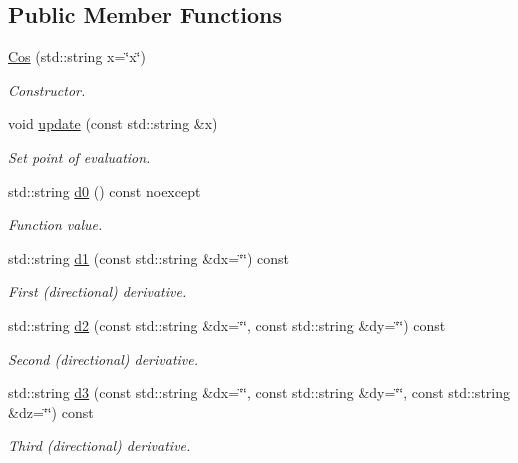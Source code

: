 \subsection*{Public Member Functions}
\begin{DoxyCompactItemize}
\item 
\hyperlink{structFunG_1_1texify_1_1Cos_afa8ef16bb63bf84ed292cf570a51fe43}{Cos} (std\-::string x=\char`\"{}x\char`\"{})
\begin{DoxyCompactList}\small\item\em Constructor. \end{DoxyCompactList}\item 
void \hyperlink{structFunG_1_1texify_1_1Cos_a72a69fddcac8cfd95da506b8f601c383}{update} (const std\-::string \&x)
\begin{DoxyCompactList}\small\item\em Set point of evaluation. \end{DoxyCompactList}\item 
std\-::string \hyperlink{structFunG_1_1texify_1_1Cos_a52e954aa7573562dfc424cd5b843080c}{d0} () const noexcept
\begin{DoxyCompactList}\small\item\em Function value. \end{DoxyCompactList}\item 
std\-::string \hyperlink{structFunG_1_1texify_1_1Cos_ae286506ec155649738ed8d43cb99844d}{d1} (const std\-::string \&dx=\char`\"{}\char`\"{}) const 
\begin{DoxyCompactList}\small\item\em First (directional) derivative. \end{DoxyCompactList}\item 
std\-::string \hyperlink{structFunG_1_1texify_1_1Cos_a27b2fd25de2226972db306db4611e3fd}{d2} (const std\-::string \&dx=\char`\"{}\char`\"{}, const std\-::string \&dy=\char`\"{}\char`\"{}) const 
\begin{DoxyCompactList}\small\item\em Second (directional) derivative. \end{DoxyCompactList}\item 
std\-::string \hyperlink{structFunG_1_1texify_1_1Cos_a017da65281e3c4862990d71788c4929c}{d3} (const std\-::string \&dx=\char`\"{}\char`\"{}, const std\-::string \&dy=\char`\"{}\char`\"{}, const std\-::string \&dz=\char`\"{}\char`\"{}) const 
\begin{DoxyCompactList}\small\item\em Third (directional) derivative. \end{DoxyCompactList}\end{DoxyCompactItemize}



